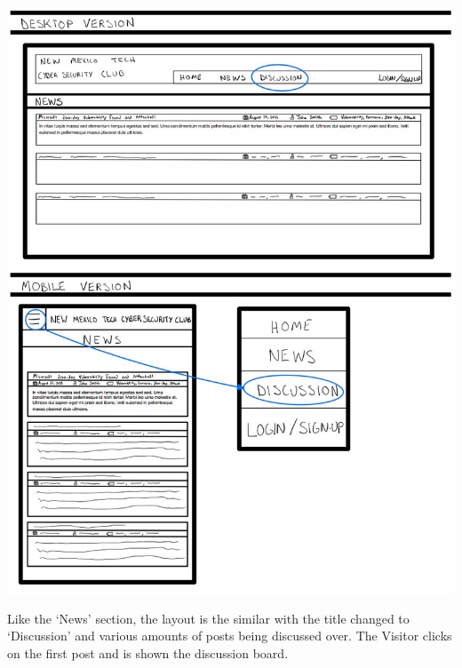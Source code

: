 \documentclass{article}
\begin{document}
\includegraphics[scale=0.60]{visitor_4.jpg} 
\par Like the ‘News’ section, the layout is the similar with the title changed to ‘Discussion’ and various amounts of posts being discussed over.  The Visitor clicks on the first post and is shown the discussion board.
\par
\end{document}
